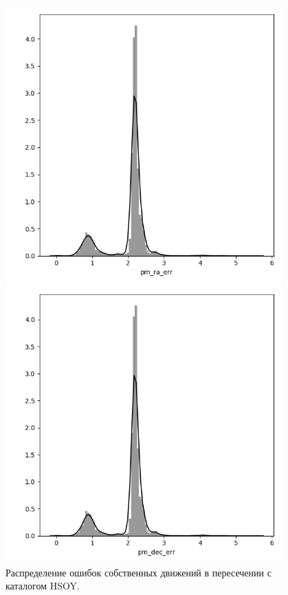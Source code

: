 \documentclass{matmex-diploma-custom}
\begin{document}
\begin{figure}[h!]
\begin{minipage}[h]{0.49\linewidth}
        \includegraphics[width=0.95\textwidth]{../imgs/pm_ra_err_distr_hsoy.png}
\end{minipage}
\hfill
\begin{minipage}[h]{0.49\linewidth}
        \includegraphics[width=0.95\textwidth]{../imgs/pm_dec_err_distr_hsoy.png}
\end{minipage}
\caption{Распределение ошибок собственных движений в пересечении с каталогом HSOY.}
\end{figure}
\end{document}
